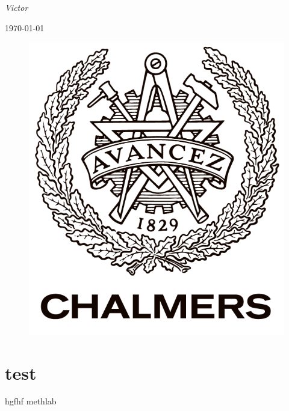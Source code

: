 \documentclass{article}
\begin{document}
\begin{titlepage}
\begin{centering}

{\huge\bfseries \par}
\vspace{1cm}
{\scshape\Large \textbf{}\par}
{\scshape\Large \par}
{\Large\itshape Victor  \\ \par}
{\large \today\par}

{   \par}
{   \par}
{    \par}


\begin{figure}[!ht]
\centering
\includegraphics[scale=0.3]{chalmers.png}
\label{fig:chalmers}

\end{figure}


\end{centering}
\end{titlepage}
\newpage
\thispagestyle{empty}
\tableofcontents
\thispagestyle{empty}
\newpage
\begin{abstract}
\end{abstract}
\section{test}
hgfhf
methlab
\setlength{\parindent}{0pt}
\setlength{\parskip}{7pt}
\end{document}
